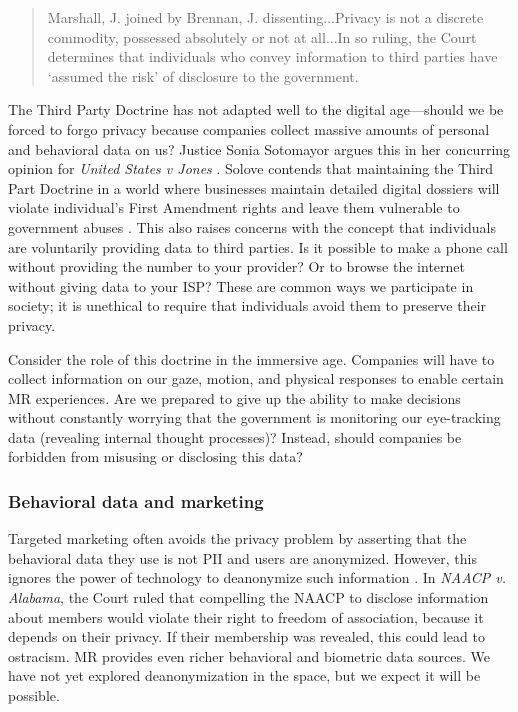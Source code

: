\begin{quote}
Marshall, J. joined by Brennan, J. dissenting...Privacy is not a discrete commodity, possessed absolutely or not at all...In so ruling, the Court determines that individuals who convey information to third parties have `assumed the risk' of disclosure to the government. 
\end{quote}

The Third Party Doctrine has not adapted well to the digital age---should we be forced to forgo privacy because companies collect massive amounts of personal and behavioral data on us? Justice Sonia Sotomayor argues this in her concurring opinion for \emph{United States v Jones} \cite{jones2012}. Solove contends that maintaining the Third Part Doctrine in a world where businesses maintain detailed digital dossiers will violate individual's First Amendment rights and leave them vulnerable to government abuses \cite{solove2001digital}. This also raises concerns with the concept that individuals are voluntarily providing data to third parties. Is it possible to make a phone call without providing the number to your provider? Or to browse the internet without giving data to your ISP? These are common ways we participate in society; it is unethical to require that individuals avoid them to preserve their privacy.

Consider the role of this doctrine in the immersive age. Companies will have to collect information on our gaze, motion, and physical responses to enable certain MR experiences. Are we prepared to give up the ability to make decisions without constantly worrying that the government is monitoring our eye-tracking data (revealing internal thought processes)? Instead, should companies be forbidden from misusing or disclosing this data? 


\subsubsection{Behavioral data and marketing}

Targeted marketing often avoids the privacy problem by asserting that the behavioral data they use is not PII and users are anonymized. However, this ignores the power of technology to deanonymize such information \cite{narayanan2008robust}. In \emph{NAACP v. Alabama}\cite{1958naacp}, the Court ruled that compelling the NAACP to disclose information about members would violate their right to freedom of association, because it depends on their privacy. If their membership was revealed, this could lead to ostracism. MR provides even richer behavioral and biometric data sources. We have not yet explored deanonymization in the space, but we expect it will be possible.

